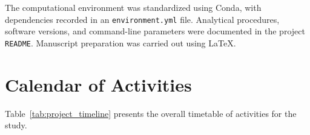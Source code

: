 The computational environment was standardized using Conda, with dependencies recorded in an \texttt{environment.yml} file. Analytical procedures, software versions, and command-line parameters were documented in the project \texttt{README}. Manuscript preparation was carried out using \LaTeX.

\section{Calendar of Activities}

Table~\ref{tab:project_timeline} presents the overall timetable of activities for the study.

\begin{table}[H]
  \centering
  \caption{Timetable of activities.}
  \label{tab:project_timeline}
\end{table}